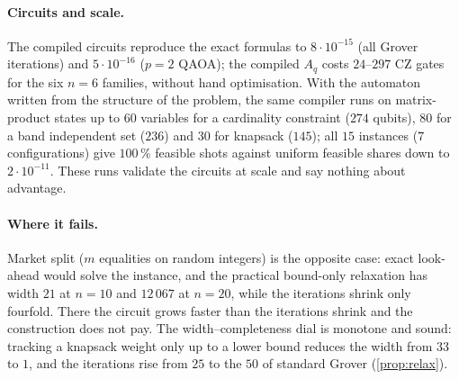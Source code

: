 \paragraph{Circuits and scale.} The compiled circuits reproduce the exact formulas to $8\cdot10^{-15}$ (all Grover iterations) and $5\cdot10^{-16}$ ($p=2$ QAOA); the compiled $A_q$ costs $24$--$297$ CZ gates for the six $n=6$ families, without hand optimisation. With the automaton written from the structure of the problem, the same compiler runs on matrix-product states up to $60$ variables for a cardinality constraint ($274$ qubits), $80$ for a band independent set ($236$) and $30$ for knapsack ($145$); all $15$ instances ($7$ configurations) give $100\,\%$ feasible shots against uniform feasible shares down to $2\cdot10^{-11}$. These runs validate the circuits at scale and say nothing about advantage.

\paragraph{Where it fails.} Market split ($m$ equalities on random integers) is the opposite case: exact look-ahead would solve the instance, and the practical bound-only relaxation has width $21$ at $n=10$ and $12\,067$ at $n=20$, while the iterations shrink only fourfold. There the circuit grows faster than the iterations shrink and the construction does not pay. The width--completeness dial is monotone and sound: tracking a knapsack weight only up to a lower bound reduces the width from $33$ to $1$, and the iterations rise from $25$ to the $50$ of standard Grover (\cref{prop:relax}).
